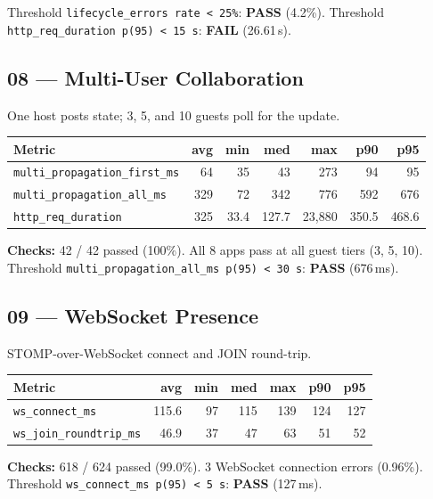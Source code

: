 \documentclass[11pt,a4paper]{article}
\newcommand{\pass}{\textcolor{pass}{\textbf{PASS}}}
\newcommand{\fail}{\textcolor{fail}{\textbf{FAIL}}}
\begin{document}
\medskip
\noindent Threshold \texttt{lifecycle\_errors rate < 25\%}: \pass{} (4.2\%).
Threshold \texttt{http\_req\_duration p(95) < 15\,s}: \fail{} (26.61\,s).

\subsection{08 — Multi-User Collaboration}

One host posts state; 3, 5, and 10 guests poll for the update.

\begin{tabular}{@{}lrrrrrr@{}}
\toprule
\textbf{Metric} & \textbf{avg} & \textbf{min} & \textbf{med} & \textbf{max} & \textbf{p90} & \textbf{p95} \\
\midrule
\texttt{multi\_propagation\_first\_ms} & 64    & 35   & 43    & 273    & 94     & 95     \\
\texttt{multi\_propagation\_all\_ms}   & 329   & 72   & 342   & 776    & 592    & 676    \\
\texttt{http\_req\_duration}           & 325   & 33.4 & 127.7 & 23,880 & 350.5  & 468.6  \\
\bottomrule
\end{tabular}

\medskip
\noindent\textbf{Checks:} 42 / 42 passed (100\%).
All 8 apps pass at all guest tiers (3, 5, 10).
Threshold \texttt{multi\_propagation\_all\_ms p(95) < 30\,s}: \pass{} (676\,ms).

\subsection{09 — WebSocket Presence}

STOMP-over-WebSocket connect and JOIN round-trip.

\begin{tabular}{@{}lrrrrrr@{}}
\toprule
\textbf{Metric} & \textbf{avg} & \textbf{min} & \textbf{med} & \textbf{max} & \textbf{p90} & \textbf{p95} \\
\midrule
\texttt{ws\_connect\_ms}        & 115.6 & 97  & 115 & 139 & 124 & 127 \\
\texttt{ws\_join\_roundtrip\_ms} & 46.9  & 37  & 47  & 63  & 51  & 52  \\
\bottomrule
\end{tabular}

\medskip
\noindent\textbf{Checks:} 618 / 624 passed (99.0\%).
3 WebSocket connection errors (0.96\%).
Threshold \texttt{ws\_connect\_ms p(95) < 5\,s}: \pass{} (127\,ms).
\end{document}
